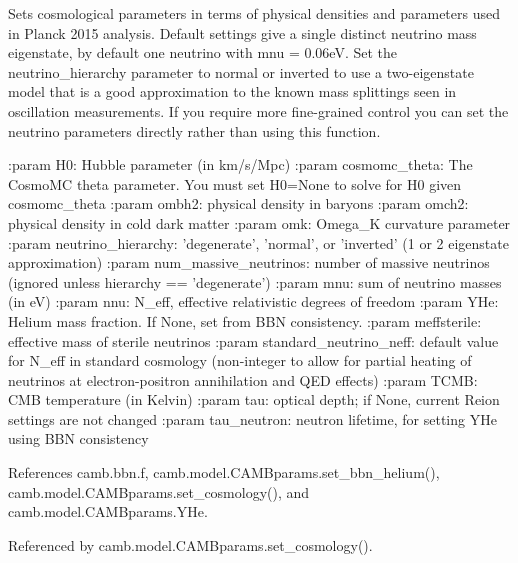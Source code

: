 \begin{DoxyVerb}Sets cosmological parameters in terms of physical densities and parameters used in Planck 2015 analysis.
Default settings give a single distinct neutrino mass eigenstate, by default one neutrino with mnu = 0.06eV.
Set the neutrino_hierarchy parameter to normal or inverted to use a two-eigenstate model that is a good
approximation to the known mass splittings seen in oscillation measurements.
If you require more fine-grained control you can set the neutrino parameters directly rather than using this function.

:param H0: Hubble parameter (in km/s/Mpc)
:param cosmomc_theta: The CosmoMC theta parameter. You must set H0=None to solve for H0 given cosmomc_theta
:param ombh2: physical density in baryons
:param omch2:  physical density in cold dark matter
:param omk: Omega_K curvature parameter
:param neutrino_hierarchy: 'degenerate', 'normal', or 'inverted' (1 or 2 eigenstate approximation)
:param num_massive_neutrinos:  number of massive neutrinos (ignored unless hierarchy == 'degenerate')
:param mnu: sum of neutrino masses (in eV)
:param nnu: N_eff, effective relativistic degrees of freedom
:param YHe: Helium mass fraction. If None, set from BBN consistency.
:param meffsterile: effective mass of sterile neutrinos
:param standard_neutrino_neff:  default value for N_eff in standard cosmology (non-integer to allow for partial
heating of neutrinos at electron-positron annihilation and QED effects)
:param TCMB: CMB temperature (in Kelvin)
:param tau: optical depth; if None, current Reion settings are not changed
:param tau_neutron: neutron lifetime, for setting YHe using BBN consistency
\end{DoxyVerb}
 

References camb.\+bbn.\+f, camb.\+model.\+C\+A\+M\+Bparams.\+set\+\_\+bbn\+\_\+helium(), camb.\+model.\+C\+A\+M\+Bparams.\+set\+\_\+cosmology(), and camb.\+model.\+C\+A\+M\+Bparams.\+Y\+He.



Referenced by camb.\+model.\+C\+A\+M\+Bparams.\+set\+\_\+cosmology().


